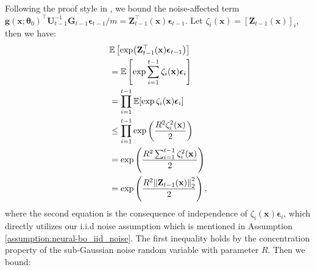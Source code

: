 Following the proof style in \citet{vakili2021optimal}, we bound the noise-affected term $\mathbf{g}(\mathbf{x}; \boldsymbol{\theta}_0)^\top \mathbf{U}^{-1}_{t-1} \mathbf{G}_{t-1} \boldsymbol{\epsilon}_{t-1}/m = \mathbf{Z}_{t-1}^\top (\mathbf{x})\boldsymbol{\epsilon}_{t-1}$. Let $\zeta_i(\mathbf{x}) = [\mathbf{Z}_{t-1}(\mathbf{x})]_i$, then we have: 
\begin{align}
    & \mathbb E \left[\exp ( \mathbf{Z}_{t-1}^\top(\mathbf{x})\boldsymbol{\epsilon}_{t-1} ) \right] \nonumber
\\
& =  \mathbb{E}\left[ \exp \sum_{i=1}^{t-1} \zeta_i(\mathbf{x}) \boldsymbol{\epsilon}_i  \right] \nonumber
\\
    & = \prod_{i=1}^{t-1} \mathbb{E} [\exp \zeta_i(\mathbf{x}) \boldsymbol{\epsilon}_i] \nonumber
\\
    &  \leq \prod_{i=1}^{t-1} \exp \left( \frac{R^2 \zeta_i^2(\mathbf{x})}{2} \right) \nonumber
\\
    &  = \exp \left (\frac{R^2 \sum_{i=1}^{t-1}\zeta_i^2(\mathbf{x})}{2} \right) \nonumber
\\
    & = \mathbb \exp \left( \frac{R^2\norm{\mathbf{Z}_{t-1}(\mathbf{x})}^2_2}{2} \right) \label{eqn:neural-bo_noise_effect}, 
\end{align}
where the second equation is the consequence of independence of $\zeta_i(\mathbf{x})\boldsymbol{\epsilon}_i$, which directly utilizes our i.i.d noise assumption which is mentioned in Assumption \ref{assumption:neural-bo_iid_noise}. The first inequality holds by the concentration property of the sub-Gaussian noise random variable with parameter $R$. Then we bound:  
